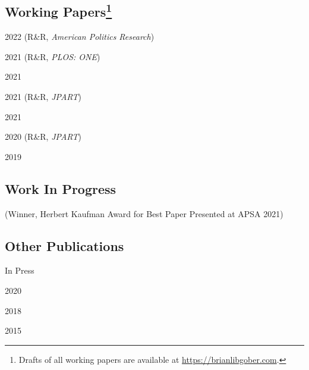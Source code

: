 \documentclass[12pt,letterpaper]{report}
\begin{document}
    \subsection*{Working Papers\footnote[2]{Drafts of all working papers are available at \href{https://brianlibgober.com}{https://brianlibgober.com}.}}
    \begin{tablist}
	\item[2022]	\tab{} (R\&R, \textit{American Politics Research})
	\item[2021] \tab{} (R\&R, \textit{PLOS: ONE})
    \item[2021] \tab{} 
    \item[2021] \tab{} (R\&R, \textit{JPART})
    \item[2021] \tab{}
    \item[2020] \tab{}  (R\&R, \textit{JPART}) %
    \item[2019] \tab{}
    \end{tablist}
    
    \subsection*{Work In Progress}
    
    \begin{tablist}
    \item[\the\year] \tab{}
    \item[\the\year] \tab{} (Winner, Herbert Kaufman Award for Best Paper Presented at APSA 2021)
    \item[\the\year] \tab{}
    \item[\the\year] \tab{}
    \end{tablist}

    \subsection*{Other Publications}
    \begin{tablist}
    \item[In Press]     \tab{}
    \item[2020] \tab{}
    \item[2018] \tab{}
    \item[2015] \tab{}
    \end{tablist}
    
\end{document}
